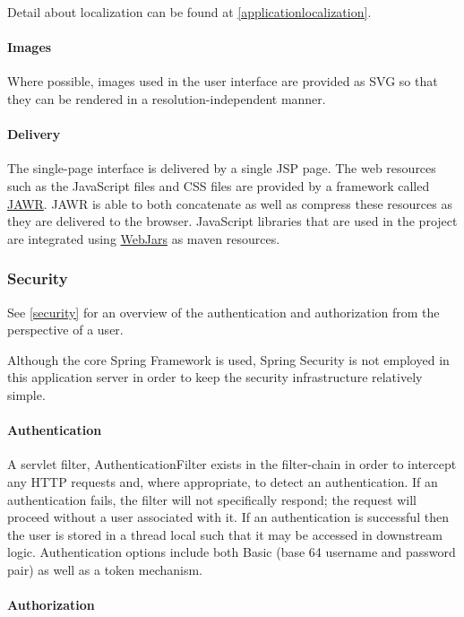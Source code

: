 Detail about localization can be found at \ref{applicationlocalization}.

\paragraph{Images}

Where possible, images used in the user interface are provided as SVG so that they can be rendered in a resolution-independent manner.

\paragraph{Delivery}

The single-page interface is delivered by a single JSP page.  The web resources such as the JavaScript files and CSS files are provided by a framework called \href{https://jawr.java.net/}{JAWR}.  JAWR is able to both concatenate as well as compress these resources as they are delivered to the browser.  JavaScript libraries that are used in the project are integrated using \href{http://www.webjars.org/}{WebJars} as maven resources.

\subsubsection{Security}

See \ref{security} for an overview of the authentication and authorization from the perspective of a user.

Although the core Spring Framework is used, Spring Security is not employed in this application server in order to keep the security infrastructure relatively simple.

\paragraph{Authentication}

A servlet filter, AuthenticationFilter exists in the filter-chain in order to intercept any HTTP requests and, where appropriate, to detect an authentication.  If an authentication fails, the filter will not specifically respond; the request will proceed without a user associated with it.  If an authentication is successful then the user is stored in a thread local such that it may be accessed in downstream logic.  Authentication options include both Basic (base 64 username and password pair) as well as a token mechanism.

\paragraph{Authorization}

